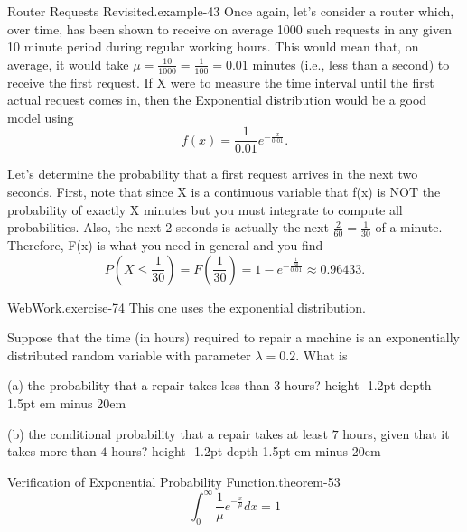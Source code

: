 \documentclass[10pt,]{book}
\newcommand{\fillin}[1]{\leavevmode\leaders\vrule height -1.2pt depth 1.5pt \hskip #1em minus #1em \null}
\numberwithin{equation}{section}
\begin{document}
\begin{example}{Router Requests Revisited.}{example-43}%
\hypertarget{p-1071}{}%
Once again, let's consider a router which, over time, has been shown to receive on average 1000 such requests in any given 10 minute period during regular working hours. This would mean that, on average, it would take \(\mu = \frac{10}{1000} = \frac{1}{100} = 0.01\) minutes (i.e., less than a second) to receive the first request. If X were to measure the time interval until the first actual request comes in, then the Exponential distribution would be a good model using%
\begin{equation*}
f(x) = \frac{1}{0.01} e^{-\frac{x}{0.01}}.
\end{equation*}
%
\par
\hypertarget{p-1072}{}%
Let's determine the probability that a first request arrives in the next two seconds. First, note that since X is a continuous variable that f(x) is NOT the probability of exactly X minutes but you must integrate to compute all probabilities. Also, the next 2 seconds is actually the next \(\frac{2}{60} = \frac{1}{30}\) of a minute. Therefore, F(x) is what you need in general and you find%
\begin{equation*}
P(X \le \frac{1}{30}) = F(\frac{1}{30}) = 1 - e^{-\frac{\frac{1}{30}}{0.01}} \approx 0.96433.
\end{equation*}
%
\end{example}
%
\par
\hypertarget{p-1073}{}%
\begin{inlineexercise}{WebWork.}{exercise-74}%
\hypertarget{p-1074}{}%
This one uses the exponential distribution.%
\par\medskip
\hypertarget{p-1075}{}%
Suppose that the time (in hours) required to repair a machine is an exponentially distributed random variable with parameter \(\lambda = 0.2\). What is%
\par
\hypertarget{p-1076}{}%
(a) the probability that a repair takes less than \(3\) hours?  \fillin{20}%
\par
\hypertarget{p-1077}{}%
(b) the conditional probability that a repair takes at least \(7\) hours, given that it takes more than \(4\) hours?  \fillin{20}%
\end{inlineexercise}
%
\par
\hypertarget{p-1078}{}%
\begin{theorem}{Verification of Exponential Probability Function.}{}{theorem-53}%
\hypertarget{p-1079}{}%
%
\begin{equation*}
\int_0^{\infty} \frac{1}{\mu} e^{-\frac{x}{\mu}} dx = 1
\end{equation*}
%
\end{theorem}
\end{document}
